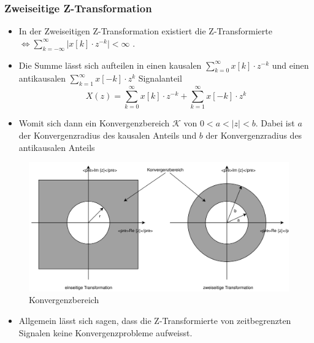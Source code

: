 \documentclass[11pt]{article}
\makeatletter
\def\maxwidth{\ifdim\Gin@nat@width>\linewidth\linewidth
    \else\Gin@nat@width\fi}
\let\Oldincludegraphics\includegraphics
\renewcommand{\includegraphics}[1]{\Oldincludegraphics[width=.8\maxwidth]{#1}}
\providecommand{\tightlist}{%
      \setlength{\itemsep}{0pt}\setlength{\parskip}{0pt}}
\def\lt{<}
\makeatother
\begin{document}
    \subsubsection{Zweiseitige
Z-Transformation}\label{zweiseitige-z-transformation}

\begin{itemize}
\tightlist
\item
  In der Zweiseitigen Z-Transformation existiert die Z-Transformierte
  \(\iff \sum_{k=-\infty}^\infty \big|x[k]\cdot z^{-k}\big| \lt \infty\)
  .
\end{itemize}

    \begin{itemize}
\tightlist
\item
  Die Summe lässt sich aufteilen in einen kausalen
  \(\sum_{k=0}^\infty x[k]\cdot z^{-k}\) und einen antikausalen
  \(\sum_{k=1}^\infty x[-k]\cdot z^{k}\) Signalanteil
  \[X(z) = \sum_{k=0}^\infty x[k]\cdot z^{-k} +  \sum_{k=1}^\infty x[-k]\cdot z^{k} \]
\end{itemize}

    \begin{itemize}
\tightlist
\item
  Womit sich dann ein Konvergenzbereich \(\mathcal{K}\) von
  \(0 \lt a \lt |z| \lt b\). Dabei ist \(a\) der Konvergenzradius des
  kausalen Anteils und \(b\) der Konvergenzradius des antikausalen
  Anteils
\end{itemize}

    \begin{figure}
\centering
\includegraphics{Konvergenzbereich.svg}
\caption{Konvergenzbereich}
\end{figure}

\begin{itemize}
\tightlist
\item
  Allgemein lässt sich sagen, dass die Z-Transformierte von
  zeitbegrenzten Signalen keine Konvergenzprobleme aufweisst.
\end{itemize}
\end{document}
